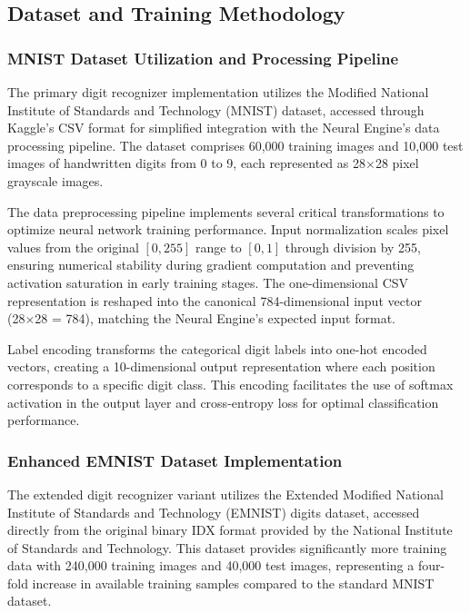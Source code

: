 \documentclass[11pt,a4paper]{report}
\begin{document}
\subsection{Dataset and Training Methodology}

\subsubsection{MNIST Dataset Utilization and Processing Pipeline}

The primary digit recognizer implementation utilizes the Modified National Institute of Standards and Technology (MNIST) dataset, accessed through Kaggle's CSV format for simplified integration with the Neural Engine's data processing pipeline. The dataset comprises 60,000 training images and 10,000 test images of handwritten digits from 0 to 9, each represented as 28×28 pixel grayscale images.

The data preprocessing pipeline implements several critical transformations to optimize neural network training performance. Input normalization scales pixel values from the original $[0, 255]$ range to $[0, 1]$ through division by 255, ensuring numerical stability during gradient computation and preventing activation saturation in early training stages. The one-dimensional CSV representation is reshaped into the canonical 784-dimensional input vector (28×28 = 784), matching the Neural Engine's expected input format.

Label encoding transforms the categorical digit labels into one-hot encoded vectors, creating a 10-dimensional output representation where each position corresponds to a specific digit class. This encoding facilitates the use of softmax activation in the output layer and cross-entropy loss for optimal classification performance.

\subsubsection{Enhanced EMNIST Dataset Implementation}

The extended digit recognizer variant utilizes the Extended Modified National Institute of Standards and Technology (EMNIST) digits dataset, accessed directly from the original binary IDX format provided by the National Institute of Standards and Technology. This dataset provides significantly more training data with 240,000 training images and 40,000 test images, representing a four-fold increase in available training samples compared to the standard MNIST dataset.
\end{document}
